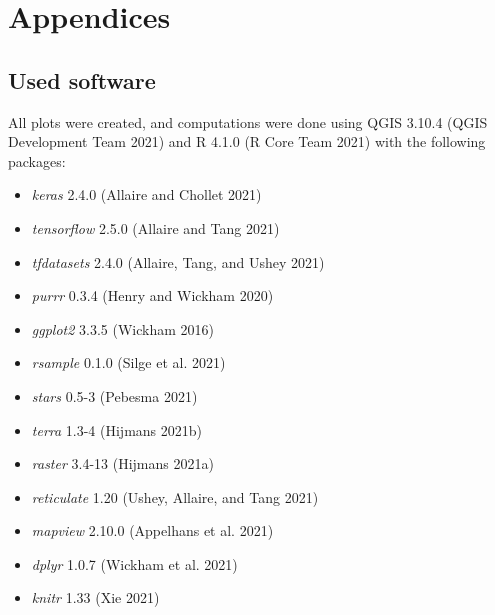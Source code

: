 \documentclass[
]{article}
\providecommand{\tightlist}{%
  \setlength{\itemsep}{0pt}\setlength{\parskip}{0pt}}
\begin{document}
\hypertarget{appendices}{%
\section{Appendices}\label{appendices}}

\hypertarget{used-software}{%
\subsection{Used software}\label{used-software}}

All plots were created, and computations were done using QGIS 3.10.4
(QGIS Development Team 2021) and R 4.1.0 (R Core Team 2021) with the
following packages:

\begin{itemize}
\tightlist
\item
  \emph{keras} 2.4.0 (Allaire and Chollet 2021)
\item
  \emph{tensorflow} 2.5.0 (Allaire and Tang 2021)
\item
  \emph{tfdatasets} 2.4.0 (Allaire, Tang, and Ushey 2021)
\item
  \emph{purrr} 0.3.4 (Henry and Wickham 2020)
\item
  \emph{ggplot2} 3.3.5 (Wickham 2016)
\item
  \emph{rsample} 0.1.0 (Silge et al. 2021)
\item
  \emph{stars} 0.5-3 (Pebesma 2021)
\item
  \emph{terra} 1.3-4 (Hijmans 2021b)
\item
  \emph{raster} 3.4-13 (Hijmans 2021a)
\item
  \emph{reticulate} 1.20 (Ushey, Allaire, and Tang 2021)
\item
  \emph{mapview} 2.10.0 (Appelhans et al. 2021)
\item
  \emph{dplyr} 1.0.7 (Wickham et al. 2021)
\item
  \emph{knitr} 1.33 (Xie 2021)
\end{itemize}
\end{document}
